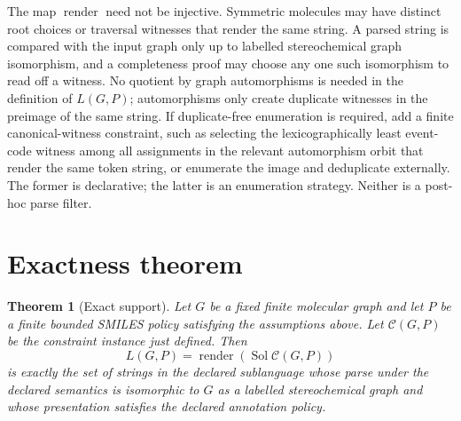 \documentclass[10pt,a4paper]{article}
\newcommand{\calC}{\mathcal C}
\newcommand{\Sol}{\operatorname{Sol}}
\newcommand{\render}{\operatorname{render}}
\newtheorem{theorem}[lemma]{Theorem}
\theoremstyle{definition}
\theoremstyle{remark}
\begin{document}
	The map \(\render\) need not be injective.  Symmetric molecules may have distinct
	root choices or traversal witnesses that render the same string.  A parsed
	string is compared with the input graph only up to labelled stereochemical graph
	isomorphism, and a completeness proof may choose any one such isomorphism to
	read off a witness.  No quotient by graph automorphisms is needed in the
	definition of \(L(G,P)\); automorphisms only create duplicate witnesses in the
	preimage of the same string.  If duplicate-free enumeration is required, add a
	finite canonical-witness constraint, such as selecting the lexicographically
	least event-code witness among all assignments in the relevant automorphism
	orbit that render the same token string, or enumerate the image and deduplicate
	externally.  The former is declarative; the latter is an enumeration strategy.
	Neither is a post-hoc parse filter.

	\section{Exactness theorem}
	\label{s:theorem}

	\begin{theorem}[Exact support]
		Let \(G\) be a fixed finite molecular graph and let \(P\) be a finite bounded
		SMILES policy satisfying the assumptions above.  Let \(\calC(G,P)\) be the
		constraint instance just defined.  Then
		\[
		L(G,P)=\render(\Sol\calC(G,P))
		\]
		is exactly the set of strings in the declared sublanguage whose parse under the
		declared semantics is isomorphic to \(G\) as a labelled stereochemical graph and
		whose presentation satisfies the declared annotation policy.
	\end{theorem}
\end{document}
